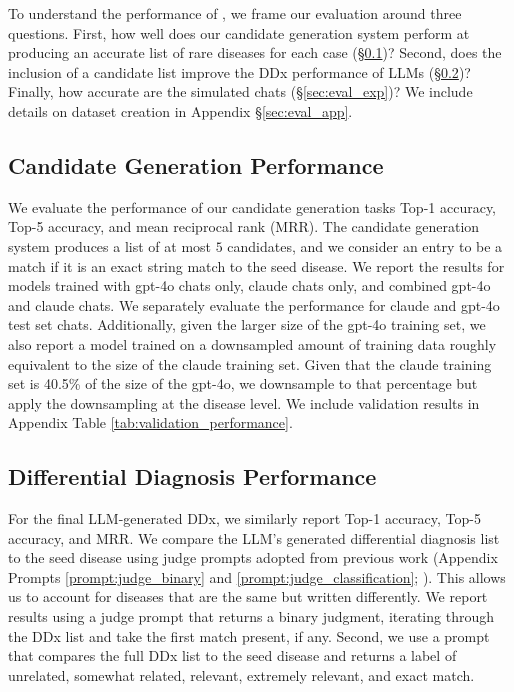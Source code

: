 

To understand the performance of \methodname, we frame our evaluation around three questions.  First, how well does our candidate generation system perform at producing an accurate list of rare diseases for each case (\S \ref{sec:eval_cand})?  Second, does the inclusion of a candidate list improve the DDx performance of LLMs (\S \ref{sec:eval_ddx})?  Finally, how accurate are the simulated chats (\S \ref{sec:eval_exp})?  We include details on dataset creation in Appendix \S \ref{sec:eval_app}.


\subsection{Candidate Generation Performance}
\label{sec:eval_cand}

We evaluate the performance of our candidate generation tasks Top-1 accuracy, Top-5 accuracy, and mean reciprocal rank (MRR). The candidate generation system produces a list of at most $5$ candidates, and we consider an entry to be a match if it is an exact string match to the seed disease.  We report the results for models trained with gpt-4o chats only, claude chats only, and combined gpt-4o and claude chats.  We separately evaluate the performance for claude and gpt-4o test set chats. Additionally, given the larger size of the gpt-4o training set, we also report a model trained on a downsampled amount of training data roughly equivalent to the size of the claude training set.  Given that the claude training set is 40.5\% of the size of the gpt-4o, we downsample to that percentage but apply the downsampling at the disease level. We include validation results in Appendix Table \ref{tab:validation_performance}.

\subsection{Differential Diagnosis Performance}
\label{sec:eval_ddx}
For the final LLM-generated DDx, we similarly report Top-1 accuracy, Top-5 accuracy, and MRR. We compare the LLM's generated differential diagnosis list to the seed disease using judge prompts adopted from previous work (Appendix Prompts \ref{prompt:judge_binary} and \ref{prompt:judge_classification}; \citet{tu2024conversationaldiagnosticai}).  This allows us to account for diseases that are the same but written differently.  We report results using a judge prompt that returns a binary judgment, iterating through the DDx list and take the first match present, if any.  Second, we use a prompt that compares the full DDx list to the seed disease and returns a label of unrelated, somewhat related, relevant, extremely relevant, and exact match.  

